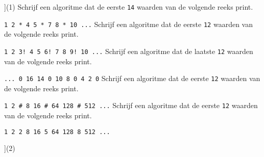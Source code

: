 \begin{exercise}
    \begin{longtasks}[counter-format=7.tsk[1]](1)
        \task
        Schrijf een algoritme dat de eerste \texttt{14} waarden van de volgende reeks print.

        \texttt{1 2 * 4 5 * 7 8 * 10 ...}
        \task
        Schrijf een algoritme dat de eerste \texttt{12} waarden van de volgende reeks print.

        \texttt{1 2 3! 4 5 6! 7 8 9! 10 ...}
        \task
        Schrijf een algoritme dat de laatste \texttt{12} waarden van de volgende reeks print.

        \texttt{... 0 16 14 0 10 8 0 4 2 0}
        \task
        Schrijf een algoritme dat de eerste \texttt{12} waarden van de volgende reeks print.

        \texttt{1 2 \# 8 16 \# 64 128 \# 512 ...}
        \task
        Schrijf een algoritme dat de eerste \texttt{12} waarden van de volgende reeks print.

        \texttt{1 2 2 8 16 5 64 128 8 512 ...}
    \end{longtasks}
\end{exercise}

\begin{solution}
    \begin{mltasks}[counter-format=7.tsk[1]](2)
        \task {}
        \task {}
        \task {}
        \task {}
        \task {}
    \end{mltasks}
\end{solution}
